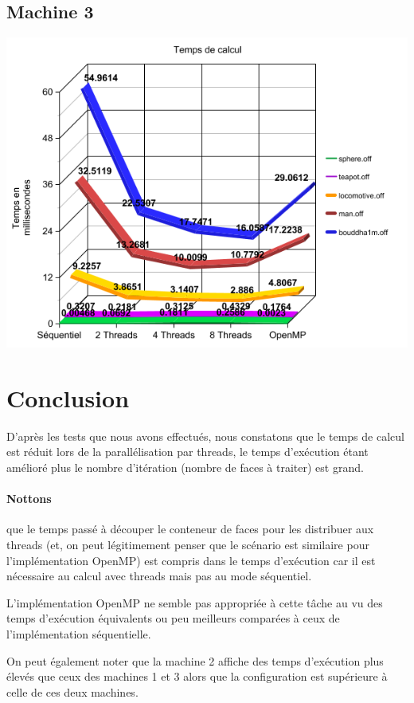 \documentclass[a4paper]{article}
\begin{document}
	\subsection{Machine 3}
	\begin{center}
		\includegraphics[scale = 0.5]{graph_execTime_machine3.png}
	\end{center}
\section{Conclusion}
D'après les tests que nous avons effectués, nous constatons que le temps de calcul est réduit lors de la parallélisation par threads, le temps d'exécution étant amélioré plus le nombre d'itération (nombre de faces à traiter) est grand.

\paragraph{Nottons} que le temps passé à découper le conteneur de faces pour les distribuer aux threads (et, on peut légitimement penser que le scénario est similaire pour l'implémentation OpenMP) est compris dans le temps d'exécution car il est nécessaire au calcul avec threads mais pas au mode séquentiel.

L'implémentation OpenMP ne semble pas appropriée à cette tâche au vu des temps d'exécution équivalents ou peu meilleurs comparées à ceux de l'implémentation séquentielle.

On peut également noter que la machine 2 affiche des temps d'exécution plus élevés que ceux des machines 1 et 3 alors que la configuration est supérieure à celle de ces deux machines.
\newpage


\end{document}
